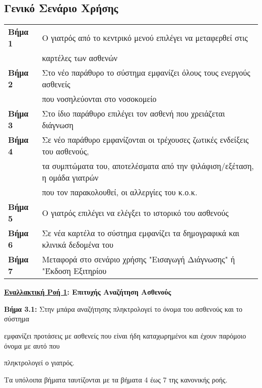 \documentclass{article}
\newcommand\T{\rule{0pt}{2.6ex}}       %
\newcommand\B{\rule[-1.2ex]{0pt}{0pt}}
\begin{document}
 \subsection{Γενικό Σενάριο Χρήσης}
 
 \begin{center}
     \begin{tabular}{|l|l|}
     \hline
      \textbf{Βήμα 1} & Ο γιατρός από το κεντρικό μενού επιλέγει να μεταφερθεί στις \T \\& καρτέλες των ασθενών \B \\
      \hline
      \textbf{Βήμα 2} &  Στο νέο παράθυρο το σύστημα εμφανίζει όλους τους ενεργούς ασθενείς \T \\& που νοσηλεύονται στο νοσοκομείο \B \\
      \hline
      \textbf{Βήμα 3} & Στο ίδιο παράθυρο επιλέγει τον ασθενή που χρειάζεται διάγνωση \T\B \\
      \hline
      \textbf{Βήμα 4} & Σε νέο παράθυρο εμφανίζονται οι τρέχουσες ζωτικές ενδείξεις του ασθενούς, \T \\& τα συμπτώματα του, αποτελέσματα από την ψιλάφιση/εξέταση, η ομάδα γιατρών \\& που τον παρακολουθεί, οι αλλεργίες του κ.ο.κ. \B \\
      \hline
      \textbf{Βήμα 5} & Ο γιατρός επιλέγει να ελέγξει το ιστορικό του ασθενούς \T\B \\
      \hline
      \textbf{Βήμα 6} & Σε νέα καρτέλα το σύστημα εμφανίζει τα δημογραφικά και κλινικά δεδομένα του \T\B \\
      \hline
      \textbf{Βήμα 7} & Μεταφορά στο σενάριο χρήσης "Εισαγωγή Διάγνωσης" ή "Έκδοση Εξιτηρίου\T\B \\
      \hline      
     
     \end{tabular}
 \end{center}
 
 \textbf{\underline{Εναλλακτική Ροή 1}: Επιτυχής Αναζήτηση Ασθενούς} \vspace{0.2cm}
\par \textbf{Βήμα 3.1:} Στην μπάρα αναζήτησης πληκτρολογεί το όνομα του ασθενούς και το σύστημα \par εμφανίζει προτάσεις με ασθενείς που είναι ήδη καταχωρημένοι και έχουν παρόμοιο όνομα με αυτό που \par πληκτρολογεί ο γιατρός.\vspace{0.1cm} 
\par Τα υπόλοιπα βήματα ταυτίζονται με τα βήματα 4 έως 7 της κανονικής ροής.
\end{document}
